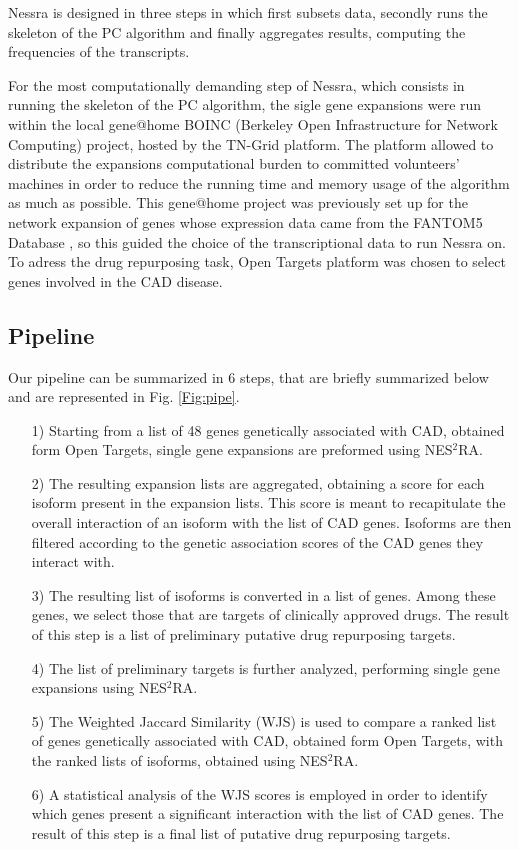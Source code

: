 \documentclass[fleqn,10pt]{SelfArx} %
\begin{document}
Nessra is designed in three steps in which first subsets data,
secondly runs the skeleton of the PC algorithm and finally aggregates results, computing the frequencies of the transcripts.

For the most computationally demanding step of Nessra, which consists in running the skeleton of the PC algorithm, the sigle gene expansions were run within the local gene@home \cite{boinc} BOINC (Berkeley Open Infrastructure for Network Computing) project, hosted by the TN-Grid platform. 
The platform allowed to distribute the expansions computational burden to committed volunteers' machines in order to reduce the running time and memory usage of the algorithm as much as possible.
This gene@home project was previously set up for the network expansion of genes whose expression data came from the FANTOM5 Database \cite{fantom}, so this guided the choice of the transcriptional data to run Nessra on.
To adress the drug repurposing task, Open Targets\cite{open} platform was chosen to select genes involved in the CAD disease.  


\subsection*{Pipeline}

Our pipeline can be summarized in  6 steps, that are briefly summarized below and are represented in Fig. \ref{Fig:pipe}.

\begin{itemize}[leftmargin=*]
	\item[1)] Starting from a list of 48 genes genetically associated with CAD, obtained form Open Targets, single gene expansions are preformed using NES$^2$RA.
	\item[2)] The resulting expansion lists are aggregated, obtaining a score for each isoform present in the expansion lists. This score is meant to recapitulate the overall interaction of an isoform with the list of CAD genes. Isoforms are then filtered according to the genetic association scores of the CAD genes they interact with.
	\item[3)] The resulting list of isoforms is converted in a list of genes. Among these genes, we select those that are targets of clinically approved drugs. The result of this step is a list of preliminary putative drug repurposing targets.
	\item[4)] The list of preliminary targets is further analyzed, performing single gene expansions using NES$^2$RA.
	\item[5)] The Weighted Jaccard Similarity (WJS) is used to compare a ranked list of genes genetically associated with CAD, obtained form Open Targets, with the ranked lists of isoforms, obtained using NES$^2$RA.
	\item[6)] A statistical analysis of the WJS scores is employed in order to identify which genes present a significant interaction with the list of CAD genes. The result of this step is a final list of putative drug repurposing targets.
\end{itemize}
\end{document}
